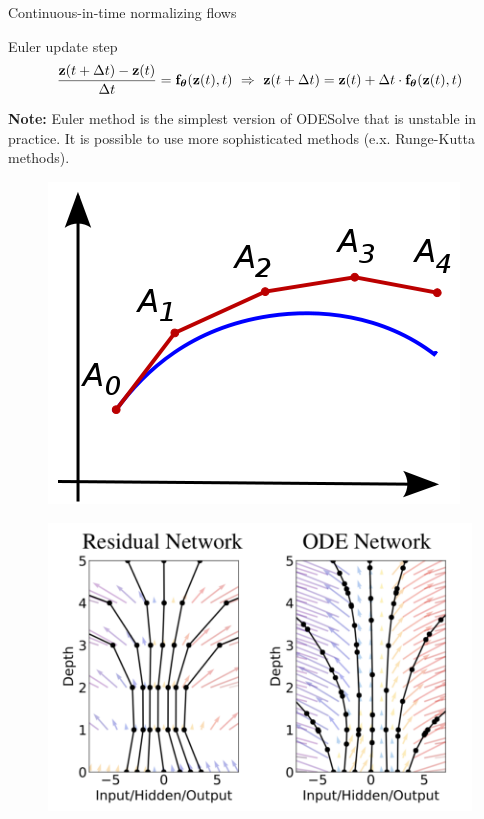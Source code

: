 \begin{frame}{Continuous-in-time normalizing flows}
	\begin{block}{Euler update step}
		\vspace{-0.5cm}
		\[
		    \frac{\mathbf{z}(t + \Delta t) - \mathbf{z}(t)}{\Delta t} = \mathbf{f}_{\boldsymbol{\theta}}(\mathbf{z}(t), t) \,\, \Rightarrow \,\, \mathbf{z}(t + \Delta t) = \mathbf{z}(t) + \Delta t \cdot \mathbf{f}_{\boldsymbol{\theta}}(\mathbf{z}(t), t)
		\]
		\vspace{-0.5cm}
	\end{block}
	\textbf{Note:} Euler method is the simplest version of ODESolve that is unstable in practice.  It is possible to use more sophisticated methods (e.x. Runge-Kutta methods).
	\begin{minipage}[t]{0.4\columnwidth}
		\begin{figure}
			\centering
			\includegraphics[width=0.7\linewidth]{figs/euler}
		\end{figure}
	\end{minipage}%
	\begin{minipage}[t]{0.6\columnwidth}
		\vspace{-0.2cm}
		\begin{figure}
			\centering
			\includegraphics[width=0.9\linewidth]{figs/resnet_vs_neural_ode.png}
		\end{figure}
	\end{minipage}
	
\end{frame}
